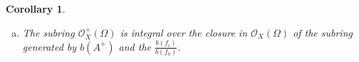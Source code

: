 \documentclass[8pt]{article}
\numberwithin{equation}{section}
\newtheorem{corollary}{Corollary} [subsection]
\newcommand{\defeq}{\vcentcolon=}
\newcommand{\Ouv}{\mathscr{O}}
\newcommand{\sep}[0]{\:|\:}
\newcommand{\cO}[0]{\mathcal{O}}
\newcommand{\Rat}[0]{\mathfrak{Rat}}
\begin{document}
\begin{corollary}
\begin{enumerate}[a.]
        \item The subring $\cO_X^+(\Omega)$ is integral over the closure in $\cO_X(\Omega)$ of the subring generated by $b(A^+)$ and the ${\frac {b(f_i)} {b(f_0)}}$.
    \end{enumerate}
\end{corollary}
\end{document}
